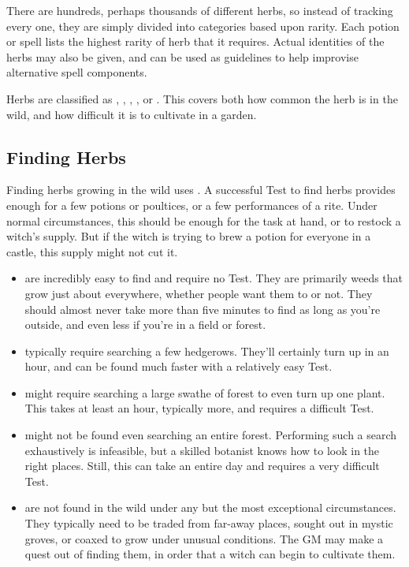 There are hundreds, perhaps thousands of different herbs, so instead of tracking every one, they are simply divided into categories based upon rarity.
Each potion or spell lists the highest rarity of herb that it requires.
Actual identities of the herbs may also be given, and can be used as guidelines to help improvise alternative spell components.

Herbs are classified as , , , , or .
This covers both how common the herb is in the wild, and how difficult it is to cultivate in a garden.

\subsection{Finding Herbs}

Finding herbs growing in the wild uses .
A successful Test to find herbs provides enough for a few potions or poultices, or a few performances of a rite.
Under normal circumstances, this should be enough for the task at hand, or to restock a witch's supply.
But if the witch is trying to brew a potion for everyone in a castle, this supply might not cut it.

\begin{itemize}
	\item
		 are incredibly easy to find and require no Test.
		They are primarily weeds that grow just about everywhere, whether people want them to or not.
		They should almost never take more than five minutes to find as long as you're outside, and even less if you're in a field or forest.
	\item
		 typically require searching a few hedgerows.
		They'll certainly turn up in an hour, and can be found much faster with a relatively easy Test.
	\item
		 might require searching a large swathe of forest to even turn up one plant.
		This takes at least an hour, typically more, and requires a difficult Test.
	\item
		 might not be found even searching an entire forest.
		Performing such a search exhaustively is infeasible, but a skilled botanist knows how to look in the right places.
		Still, this can take an entire day and requires a very difficult Test.
	\item
		 are not found in the wild under any but the most exceptional circumstances.
		They typically need to be traded from far-away places, sought out in mystic groves, or coaxed to grow under unusual conditions.
		The GM may make a quest out of finding them, in order that a witch can begin to cultivate them.
\end{itemize}

